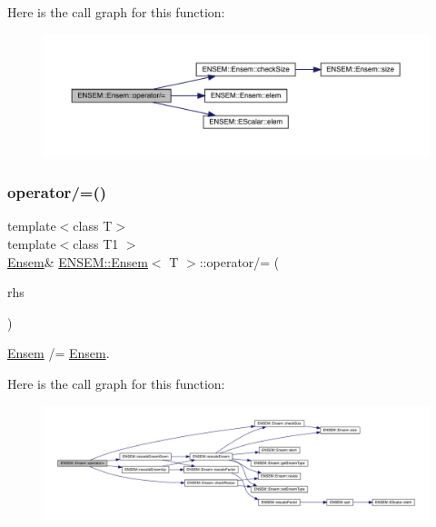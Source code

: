 Here is the call graph for this function\+:
\nopagebreak
\begin{figure}[H]
\begin{center}
\leavevmode
\includegraphics[width=350pt]{d7/d3e/classENSEM_1_1Ensem_a32bf70c0844ce98695151457bf9df018_cgraph}
\end{center}
\end{figure}
\mbox{\label{classENSEM_1_1Ensem_aa0d7f0d69f4c1c1adc551c91abcf271a}} 
\subsubsection{\texorpdfstring{operator/=()}{operator/=()}\hspace{0.1cm}{\footnotesize\ttfamily [4/6]}}
{\footnotesize\ttfamily template$<$class T$>$ \\
template$<$class T1 $>$ \\
\mbox{\hyperlink{classENSEM_1_1Ensem}{Ensem}}\& \mbox{\hyperlink{classENSEM_1_1Ensem}{E\+N\+S\+E\+M\+::\+Ensem}}$<$ T $>$\+::operator/= (\begin{DoxyParamCaption}\item[{const \mbox{\hyperlink{classENSEM_1_1Ensem}{Ensem}}$<$ T1 $>$ \&}]{rhs }\end{DoxyParamCaption})\hspace{0.3cm}{\ttfamily [inline]}}



\mbox{\hyperlink{classENSEM_1_1Ensem}{Ensem}} /= \mbox{\hyperlink{classENSEM_1_1Ensem}{Ensem}}. 

Here is the call graph for this function\+:
\nopagebreak
\begin{figure}[H]
\begin{center}
\leavevmode
\includegraphics[width=350pt]{d7/d3e/classENSEM_1_1Ensem_aa0d7f0d69f4c1c1adc551c91abcf271a_cgraph}
\end{center}
\end{figure}
\mbox{\label{classENSEM_1_1Ensem_aa0d7f0d69f4c1c1adc551c91abcf271a}} 
